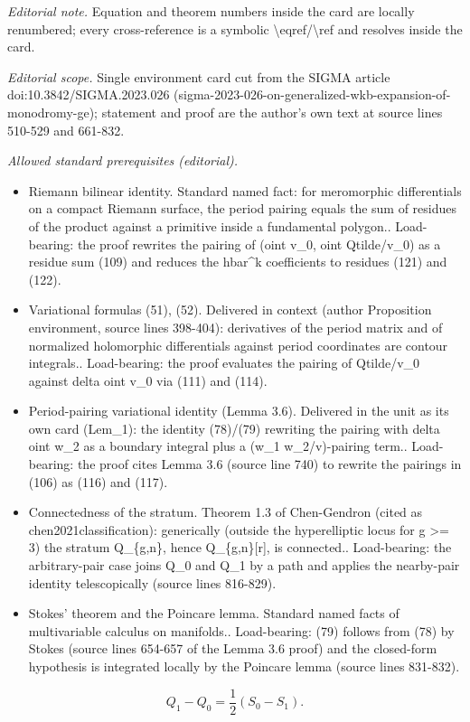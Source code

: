 \documentclass[10pt,a4paper]{article}
\numberwithin{equation}{section}
\theoremstyle{definition}
\begin{document}
\noindent\textit{Editorial note.} Equation and theorem numbers inside the card are locally renumbered; every cross-reference is a symbolic \textbackslash{}eqref/\textbackslash{}ref and resolves inside the card.\par\medskip
\noindent\textit{Editorial scope.} Single environment card cut from the SIGMA article doi:10.3842/SIGMA.2023.026 (sigma-2023-026-on-generalized-wkb-expansion-of-monodromy-ge); statement and proof are the author's own text at source lines 510-529 and 661-832.\par\medskip
\noindent\textit{Allowed standard prerequisites (editorial).}\begin{itemize}
\item Riemann bilinear identity. Standard named fact: for meromorphic differentials on a compact Riemann surface, the period pairing equals the sum of residues of the product against a primitive inside a fundamental polygon.. Load-bearing: the proof rewrites the pairing of (oint v\_0, oint Qtilde/v\_0) as a residue sum (109) and reduces the hbar\textasciicircum{}k coefficients to residues (121) and (122).
\item Variational formulas (51), (52). Delivered in context (author Proposition environment, source lines 398-404): derivatives of the period matrix and of normalized holomorphic differentials against period coordinates are contour integrals.. Load-bearing: the proof evaluates the pairing of Qtilde/v\_0 against delta oint v\_0 via (111) and (114).
\item Period-pairing variational identity (Lemma 3.6). Delivered in the unit as its own card (Lem\_1): the identity (78)/(79) rewriting the pairing with delta oint w\_2 as a boundary integral plus a (w\_1 w\_2/v)-pairing term.. Load-bearing: the proof cites Lemma 3.6 (source line 740) to rewrite the pairings in (106) as (116) and (117).
\item Connectedness of the stratum. Theorem 1.3 of Chen-Gendron (cited as chen2021classification): generically (outside the hyperelliptic locus for g >= 3) the stratum Q\_\{g,n\}, hence Q\_\{g,n\}[r], is connected.. Load-bearing: the arbitrary-pair case joins Q\_0 and Q\_1 by a path and applies the nearby-pair identity telescopically (source lines 816-829).
\item Stokes' theorem and the Poincare lemma. Standard named facts of multivariable calculus on manifolds.. Load-bearing: (79) follows from (78) by Stokes (source lines 654-657 of the Lemma 3.6 proof) and the closed-form hypothesis is integrated locally by the Poincare lemma (source lines 831-832).
\end{itemize}\medskip
\begin{equation}\label{66}Q_1-Q_0=\frac{1}{2}(S_0 -S_1 ).\end{equation}
\end{document}

